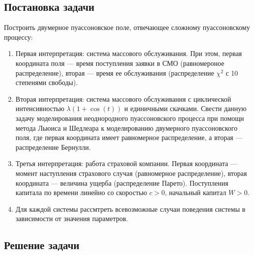 \documentclass[oneside, final, 12pt]{article}
\begin{document}
\subsection{Постановка задачи}
    Построить двумерное пуассоновское поле, отвечающее сложному пуассоновскому процессу:
    \begin{enumerate} 
        \item Первая интерпретация: система массового обслуживания. При этом, первая координата поля ---
        		время поступления заявки в СМО (равномероное распределение), вторая --- время ее обслуживания
        		(распределение $\chi^2$ с 10 степенями свободы).
        \item Вторая интерпретация: система массового обслуживания с циклической интенсивностью 
        		$\lambda (1+\cos(t))$ и единичными скачками. Свести данную задачу моделирования
        		неоднородного пуассоновского процесса при помощи метода Льюиса и Шедлеара к моделированию 
        		двумерного пуассоновского поля, где первая координата имеет равномерное распределение, а 
        		вторая --- распределение Бернулли. 
        \item Третья интерпретация: работа страховой компании. Первая координата --- момент наступления 
        		страхового случая (равномерное распределение), вторая координата --- величина ущерба 
        		(распределение Парето). Поступления капитала по времени линейно со скоростью $c>0$, 
        		начальный капитал $W>0$.	
		\item Для каждой системы рассмтреть всевозможные случаи поведения системы в зависимости от
				значения параметров.
    \end{enumerate}
\subsection{Решение задачи}
\end{document}
